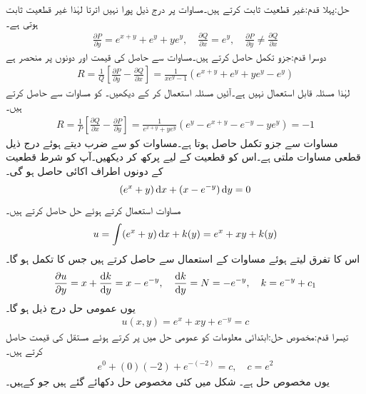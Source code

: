 حل:پہلا قدم:\quad غیر قطعیت ثابت کرتے ہیں۔مساوات  پر درج ذیل پورا نہیں اترتا لہٰذا غیر قطعیت ثابت ہوتی ہے۔
\begin{align*}
\frac{\partial P}{\partial y}=e^{x+y}+e^y+ye^y,\quad \frac{\partial Q}{\partial x}=e^y, \quad \frac{\partial P}{\partial y}\ne  \frac{\partial Q}{\partial x}
\end{align*} 
دوسرا قدم:\quad جزو تکمل حاصل کرتے ہیں۔مساوات  سے حاصل  کی قیمت  اور  دونوں پر منحصر ہے 
\begin{align*}
R=\frac{1}{Q}\left[ \frac{\partial P}{\partial y}-\frac{\partial Q}{\partial x}\right]=\frac{1}{xe^y-1}(e^{x+y}+e^y+ye^y-e^y)
\end{align*}
لہٰذا مسئلہ  قابل استعمال نہیں ہے۔آئیں مسئلہ  استعمال کر کے دیکھیں۔  کو مساوات  سے حاصل کرتے ہیں۔
\begin{align*}
R=\frac{1}{P}\left[ \frac{\partial Q}{\partial x}-\frac{\partial P}{\partial y}\right]=\frac{1}{e^{x+y}+ye^y}(e^y-e^{x+y}-e^{-y}-ye^y)=-1
\end{align*}
مساوات  سے جزو تکمل  حاصل ہوتا ہے۔مساوات  کو  سے ضرب دیتے ہوئے  درج ذیل قطعی مساوات ملتی ہے۔اس کو قطعیت کے لیے پرکھ کر دیکھیں۔آپ کو شرط قطعیت کے دونوں اطراف اکائی حاصل ہو گی۔
\begin{align*}
(e^{x}+y)\dif x+(x-e^{-y})\dif y=0
\end{align*}
مساوات  استعمال کرتے ہوئے حل حاصل کرتے ہیں۔
\begin{align*}
u=\int (e^{x}+y) \dif x+k(y)=e^x+xy+k(y)
\end{align*}
اس کا  تفرق لیتے ہوئے مساوات  کے استعمال سے  حاصل کرتے ہیں جس کا تکمل  ہو گا۔
\begin{align*}
\frac{\partial u}{\partial y}=x+\frac{\dif k}{\dif y}=x-e^{-y}, \quad \frac{\dif k}{\dif y}=N=-e^{-y}, \quad k=e^{-y}+c_1
\end{align*}
یوں عمومی حل درج ذیل ہو گا۔
\begin{align}
u(x,y)=e^x+xy+e^{-y}=c
\end{align}
تیسرا قدم:مخصوص حل:\quad ابتدائی معلومات  کو عمومی حل میں پر کرتے ہوئے مستقل کی قیمت حاصل کرتے ہیں۔
\begin{align*}
e^0+(0)(-2)+e^{-(-2)}=c, \quad c=e^2
\end{align*}
یوں مخصوص حل  ہے۔ شکل  میں کئی مخصوص حل دکھائے گئے ہیں جو    کےہیں۔

